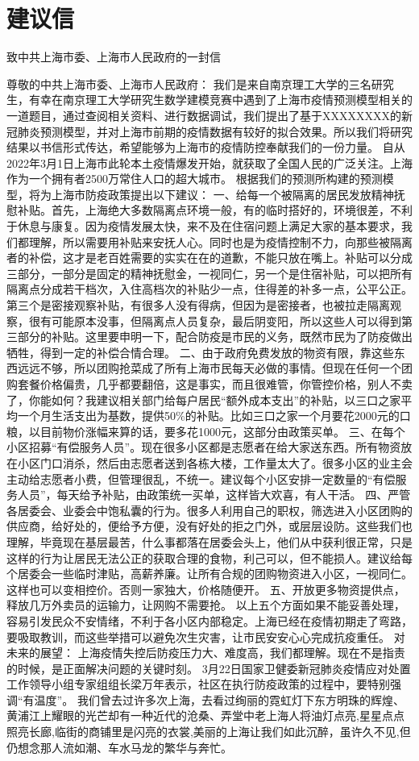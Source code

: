 \documentclass[bwprint]{gmcmthesis}
\numberwithin{figure}{section}
\begin{document}
\section{建议信}
致中共上海市委、上海市人民政府的一封信

尊敬的中共上海市委、上海市人民政府：
我们是来自南京理工大学的三名研究生，有幸在南京理工大学研究生数学建模竞赛中遇到了上海市疫情预测模型相关的一道题目，通过查阅相关资料、进行数据调试，我们提出了基于XXXXXXXX的新冠肺炎预测模型，并对上海市前期的疫情数据有较好的拟合效果。所以我们将研究结果以书信形式传达，希望能够为上海市的疫情防控奉献我们的一份力量。
自从2022年3月1日上海市此轮本土疫情爆发开始，就获取了全国人民的广泛关注。上海作为一个拥有者2500万常住人口的超大城市。
根据我们的预测所构建的预测模型，将为上海市防疫政策提出以下建议：
一、给每一个被隔离的居民发放精神抚慰补贴。首先，上海绝大多数隔离点环境一般，有的临时搭好的，环境很差，不利于休息与康复。因为疫情发展太快，来不及在住宿问题上满足大家的基本要求，我们都理解，所以需要用补贴来安抚人心。同时也是为疫情控制不力，向那些被隔离者的补偿，这才是老百姓需要的实实在在的道歉，不能只放在嘴上。补贴可以分成三部分，一部分是固定的精神抚慰金，一视同仁，另一个是住宿补贴，可以把所有隔离点分成若干档次，入住高档次的补贴少一点，住得差的补多一点，公平公正。第三个是密接观察补贴，有很多人没有得病，但因为是密接者，也被拉走隔离观察，很有可能原本没事，但隔离点人员复杂，最后阴变阳，所以这些人可以得到第三部分的补贴。这里要申明一下，配合防疫是市民的义务，既然市民为了防疫做出牺牲，得到一定的补偿合情合理。
二、由于政府免费发放的物资有限，靠这些东西远远不够，所以团购抢菜成了所有上海市民每天必做的事情。但现在任何一个团购套餐价格偏贵，几乎都要翻倍，这是事实，而且很难管，你管控价格，别人不卖了，你能如何？我建议相关部门给每户居民“额外成本支出”的补贴，以三口之家平均一个月生活支出为基数，提供50\%的补贴。比如三口之家一个月要花2000元的口粮，以目前物价涨幅来算的话，要多花1000元，这部分由政策买单。
三、在每个小区招募“有偿服务人员”。现在很多小区都是志愿者在给大家送东西。所有物资放在小区门口消杀，然后由志愿者送到各栋大楼，工作量太大了。很多小区的业主会主动给志愿者小费，但管理很乱，不统一。建议每个小区安排一定数量的“有偿服务人员”，每天给予补贴，由政策统一买单，这样皆大欢喜，有人干活。
四、严管各居委会、业委会中饱私囊的行为。很多人利用自己的职权，筛选进入小区团购的供应商，给好处的，便给予方便，没有好处的拒之门外，或层层设防。这些我们也理解，毕竟现在基层最苦，什么事都落在居委会头上，他们从中获利很正常，只是这样的行为让居民无法公正的获取合理的食物，利己可以，但不能损人。建议给每个居委会一些临时津贴，高薪养廉。让所有合规的团购物资进入小区，一视同仁。这样也可以变相控价。否则一家独大，价格随便开。
五、开放更多物资提供点，释放几万外卖员的运输力，让网购不需要抢。
以上五个方面如果不能妥善处理，容易引发民众不安情绪，不利于各小区内部稳定。上海已经在疫情初期走了弯路，要吸取教训，而这些举措可以避免次生灾害，让市民安安心心完成抗疫重任。
对未来的展望：
上海疫情失控后防疫压力大、难度高，我们都理解。现在不是指责的时候，是正面解决问题的关键时刻。
3月22日国家卫健委新冠肺炎疫情应对处置工作领导小组专家组组长梁万年表示，社区在执行防疫政策的过程中，要特别强调“有温度”。
    我们曾去过许多次上海，去看过绚丽的霓虹灯下东方明珠的辉煌、黄浦江上耀眼的光芒却有一种近代的沧桑、弄堂中老上海人将油灯点亮,星星点点照亮长廊,临街的商铺里是闪亮的衣裳,美丽的上海让我们如此沉醉，虽许久不见,但仍想念那人流如潮、车水马龙的繁华与奔忙。
\end{document}
